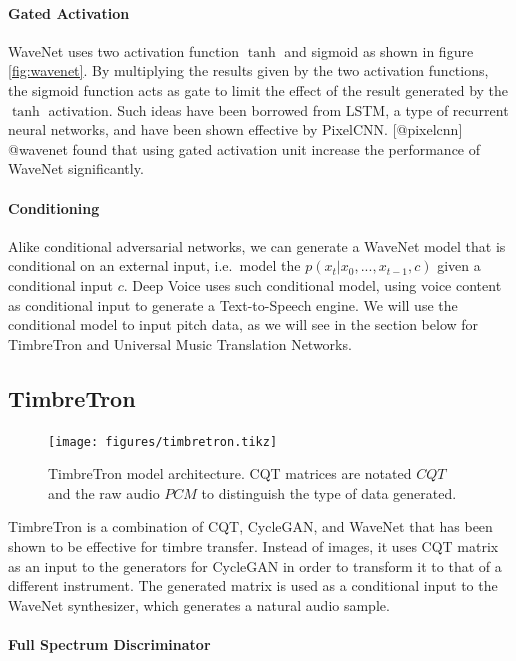 \documentclass[]{report}
\begin{document}
\paragraph{Gated Activation}

WaveNet uses two activation function \(\tanh\) and sigmoid as shown in
figure \ref{fig:wavenet}. By multiplying the results given by the two
activation functions, the sigmoid function acts as gate to limit the
effect of the result generated by the \(\tanh\) activation. Such ideas
have been borrowed from LSTM, a type of recurrent neural networks, and
have been shown effective by PixelCNN. {[}@pixelcnn{]} @wavenet found
that using gated activation unit increase the performance of WaveNet
significantly.

\paragraph{Conditioning}

Alike conditional adversarial networks, we can generate a WaveNet model
that is conditional on an external input, i.e.~model the
\(p(x_t | x_0, ..., x_{t-1}, c)\) given a conditional input \(c\). Deep
Voice uses such conditional model, using voice content as conditional
input to generate a Text-to-Speech engine. We will use the conditional
model to input pitch data, as we will see in the section below for
TimbreTron and Universal Music Translation Networks.

\hypertarget{timbretron}{%
\subsection{TimbreTron}\label{timbretron}}

\begin{figure}[h]
    \texttt{[image: figures/timbretron.tikz]}
    \centering
    \caption{TimbreTron model architecture. CQT matrices are notated $CQT$ and the raw audio $PCM$ to distinguish the type of data generated.} \label{fig:timbretron}
\end{figure}

TimbreTron is a combination of CQT, CycleGAN, and WaveNet that has been
shown to be effective for timbre transfer. Instead of images, it uses
CQT matrix as an input to the generators for CycleGAN in order to
transform it to that of a different instrument. The generated matrix is
used as a conditional input to the WaveNet synthesizer, which generates
a natural audio sample.

\paragraph{Full Spectrum Discriminator}
\end{document}
